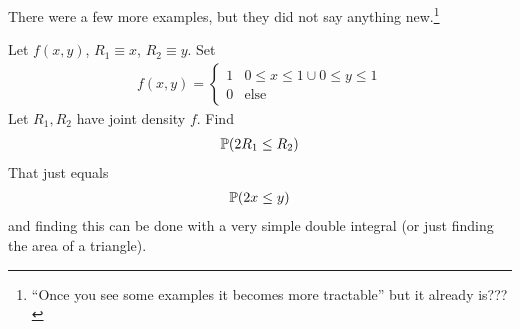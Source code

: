 There were a few more examples, but they did not say anything new.\footnote{``Once you see some examples it becomes more tractable'' but it already is???}

\begin{example}
    Let $f(x,y)$, $R_1 \equiv x$, $R_2 \equiv y$. Set
    \begin{align}
        f(x,y) = \begin{cases}
            1 & 0 \le x \le 1 \cup 0 \le y \le 1\\
            0 & \text{else}
        \end{cases}
    \end{align}
    Let $R_1, R_2$ have joint density $f$. Find
    \begin{align}
        \mathbb{P}(2 R_1 \le R_2)
    \end{align}
    That just equals
    \begin{align}
        \mathbb{P}(2x \le y)
    \end{align}
    and finding this can be done with a very simple double integral (or just finding the area of a triangle).
\end{example}
